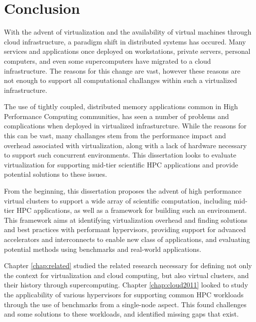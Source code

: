 
\chapter{Conclusion}
\label{chap:conc}

With the advent of virtualization and the availability of virtual machines through cloud infrastructure, a paradigm shift in distributed systems has occured. Many services and applications once deployed on workstations, private servers, personal computers, and even some supercomputers have migrated to a cloud infrastructure. The reasons for this change are vast, however these reasons are not enough to support all computational challanges within such a virtualized infrastructure.

The use of tightly coupled, distributed memory applications common in High Performance Computing communities, has seen a number of problems and complications when deployed in virtualized infrasturcture.  While the reasons for this can be vast, many challanges  stem from the performance impact and overhead associated with virtualization, along with a lack of hardware necessary to support such concurrent environments. This dissertation looks to evaluate virtualization for supporting mid-tier scientific HPC applications and provide potential solutions to these issues.  

From the beginning, this dissertation proposes the advent of high performance virtual clusters to support a wide array of scientific computation, including mid-tier HPC applications, as well as a framework for building such an environment. This framework aims at identifying virtualization overhead and finding solutions and best practices with performant hypervisors, providing support for advanced accelerators and interconnects to enable new class of applications, and evaluating potential methods using benchmarks and real-world applications. 

Chapter \ref{chap:related} studied the related research necessary for defining not only the context for virtualization and cloud computing, but also virtual clusters, and their history through supercomputing.  Chapter \ref{chap:cloud2011} looked to study the applicability of various hypervisors for supporting common HPC workloads through the use of benchmarks from a single-node aspect.  This found challenges and some solutions to these workloads, and identified missing gaps that exist. 

